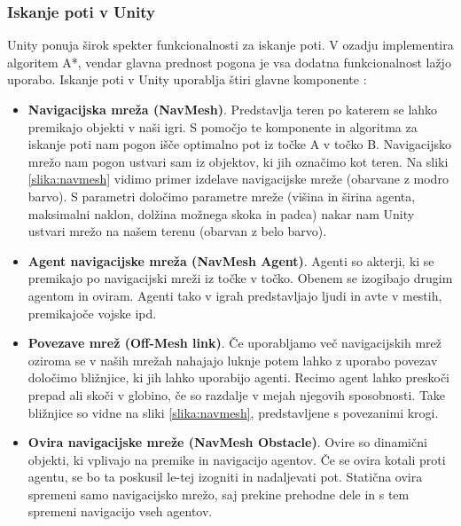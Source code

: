 \documentclass[12pt,a4paper,twoside]{book}
\begin{document}
\subsubsection{Iskanje poti v Unity}

Unity ponuja širok spekter funkcionalnosti za iskanje poti. V ozadju implementira algoritem A*, vendar glavna prednost pogona je vsa dodatna funkcionalnost lažjo uporabo. Iskanje poti v Unity uporablja štiri glavne komponente \cite{navmesh}:
\begin{itemize}
	\item \textbf{Navigacijska mreža (NavMesh)}. Predstavlja teren po katerem se lahko premikajo objekti v naši igri. S pomočjo te komponente in algoritma za iskanje poti nam pogon išče optimalno pot iz točke A v točko B. Navigacijsko mrežo nam pogon ustvari sam iz objektov, ki jih označimo kot teren. Na sliki \ref{slika:navmesh} vidimo primer izdelave navigacijske mreže (obarvane z modro barvo). S parametri določimo parametre mreže (višina in širina agenta, maksimalni naklon, dolžina možnega skoka in padca) nakar nam Unity ustvari mrežo na našem terenu (obarvan z belo barvo).
	\item \textbf{Agent navigacijske mreža (NavMesh Agent)}. Agenti so akterji, ki se premikajo po navigacijski mreži iz točke v točko. Obenem se izogibajo drugim agentom in oviram. Agenti tako v igrah predstavljajo ljudi in avte v mestih, premikajoče vojske ipd.
	\item \textbf{Povezave mrež (Off-Mesh link)}. Če uporabljamo več navigacijskih mrež oziroma se v naših mrežah nahajajo luknje potem lahko z uporabo povezav določimo bližnjice, ki jih lahko uporabijo agenti. Recimo agent lahko preskoči prepad ali skoči v globino, če so razdalje v mejah njegovih sposobnosti. Take bližnjice so vidne na sliki \ref{slika:navmesh}, predstavljene s povezanimi krogi.
	\item \textbf{Ovira navigacijske mreže (NavMesh Obstacle)}. Ovire so dinamični objekti, ki vplivajo na premike in navigacijo agentov. Če se ovira kotali proti agentu, se bo ta poskusil le-tej izogniti in nadaljevati pot. Statična ovira spremeni samo navigacijsko mrežo, saj prekine prehodne dele in s tem spremeni navigacijo vseh agentov. 
\end{itemize}
\end{document}
